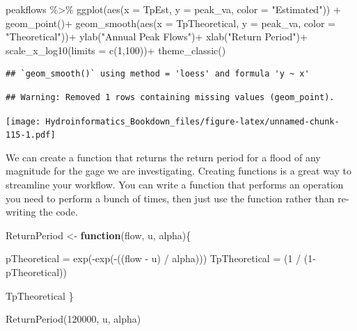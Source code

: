 \documentclass[
]{book}
\newenvironment{Shaded}{\begin{snugshade}}{\end{snugshade}}
\newcommand{\AttributeTok}[1]{\textcolor[rgb]{0.77,0.63,0.00}{#1}}
\newcommand{\ControlFlowTok}[1]{\textcolor[rgb]{0.13,0.29,0.53}{\textbf{#1}}}
\newcommand{\DecValTok}[1]{\textcolor[rgb]{0.00,0.00,0.81}{#1}}
\newcommand{\FunctionTok}[1]{\textcolor[rgb]{0.00,0.00,0.00}{#1}}
\newcommand{\NormalTok}[1]{#1}
\newcommand{\OtherTok}[1]{\textcolor[rgb]{0.56,0.35,0.01}{#1}}
\newcommand{\SpecialCharTok}[1]{\textcolor[rgb]{0.00,0.00,0.00}{#1}}
\newcommand{\StringTok}[1]{\textcolor[rgb]{0.31,0.60,0.02}{#1}}
\begin{document}
\begin{Shaded}
\begin{Highlighting}[]
\NormalTok{peakflows }\SpecialCharTok{\%\textgreater{}\%} \FunctionTok{ggplot}\NormalTok{(}\FunctionTok{aes}\NormalTok{(}\AttributeTok{x =}\NormalTok{ TpEst, }\AttributeTok{y =}\NormalTok{ peak\_va, }\AttributeTok{color =} \StringTok{"Estimated"}\NormalTok{)) }\SpecialCharTok{+}
  \FunctionTok{geom\_point}\NormalTok{()}\SpecialCharTok{+}
  \FunctionTok{geom\_smooth}\NormalTok{(}\FunctionTok{aes}\NormalTok{(}\AttributeTok{x =}\NormalTok{ TpTheoretical, }\AttributeTok{y =}\NormalTok{ peak\_va, }\AttributeTok{color =} \StringTok{"Theoretical"}\NormalTok{))}\SpecialCharTok{+}
  \FunctionTok{ylab}\NormalTok{(}\StringTok{"Annual Peak Flows"}\NormalTok{)}\SpecialCharTok{+}
  \FunctionTok{xlab}\NormalTok{(}\StringTok{"Return Period"}\NormalTok{)}\SpecialCharTok{+}
  \FunctionTok{scale\_x\_log10}\NormalTok{(}\AttributeTok{limits =} \FunctionTok{c}\NormalTok{(}\DecValTok{1}\NormalTok{,}\DecValTok{100}\NormalTok{))}\SpecialCharTok{+}
  \FunctionTok{theme\_classic}\NormalTok{()}
\end{Highlighting}
\end{Shaded}

\begin{verbatim}
## `geom_smooth()` using method = 'loess' and formula 'y ~ x'
\end{verbatim}

\begin{verbatim}
## Warning: Removed 1 rows containing missing values (geom_point).
\end{verbatim}

\texttt{[image: Hydroinformatics\_Bookdown\_files/figure-latex/unnamed-chunk-115-1.pdf]}

We can create a function that returns the return period for a flood of any magnitude for the gage we are investigating. Creating functions is a great way to streamline your workflow. You can write a function that performs an operation you need to perform a bunch of times, then just use the function rather than re-writing the code.

\begin{Shaded}
\begin{Highlighting}[]
\NormalTok{ReturnPeriod }\OtherTok{\textless{}{-}} \ControlFlowTok{function}\NormalTok{(flow, u, alpha)\{}
  
\NormalTok{  pTheoretical }\OtherTok{=} \FunctionTok{exp}\NormalTok{(}\SpecialCharTok{{-}}\FunctionTok{exp}\NormalTok{(}\SpecialCharTok{{-}}\NormalTok{((flow }\SpecialCharTok{{-}}\NormalTok{ u) }\SpecialCharTok{/}\NormalTok{ alpha)))}
\NormalTok{  TpTheoretical }\OtherTok{=}\NormalTok{ (}\DecValTok{1} \SpecialCharTok{/}\NormalTok{ (}\DecValTok{1}\SpecialCharTok{{-}}\NormalTok{pTheoretical))}
  
\NormalTok{  TpTheoretical}
\NormalTok{\}}

\FunctionTok{ReturnPeriod}\NormalTok{(}\DecValTok{120000}\NormalTok{, u, alpha)}
\end{Highlighting}
\end{Shaded}
\end{document}
